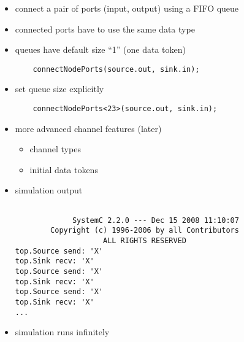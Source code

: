 \begin{frame}[fragile=singleslide]
\begin{itemize}
\item connect a pair of ports (input, output) using a FIFO queue
\item connected ports have to use the same data type
\item queues have default size ``1'' (one data token)
\begin{lstlisting}
    connectNodePorts(source.out, sink.in);
\end{lstlisting}
\item set queue size explicitly
\begin{lstlisting}
    connectNodePorts<23>(source.out, sink.in);
\end{lstlisting}
\item more advanced channel features (later)
\begin{itemize}
\item channel types
\item initial data tokens
\end{itemize}
\end{itemize}
\end{frame}




\begin{frame}[fragile=singleslide]
\begin{itemize}
\item simulation output
\begin{lstlisting}

             SystemC 2.2.0 --- Dec 15 2008 11:10:07
        Copyright (c) 1996-2006 by all Contributors
                    ALL RIGHTS RESERVED
top.Source send: 'X'
top.Sink recv: 'X'
top.Source send: 'X'
top.Sink recv: 'X'
top.Source send: 'X'
top.Sink recv: 'X'
...
\end{lstlisting}
\item simulation runs infinitely
\end{itemize}
\end{frame}





